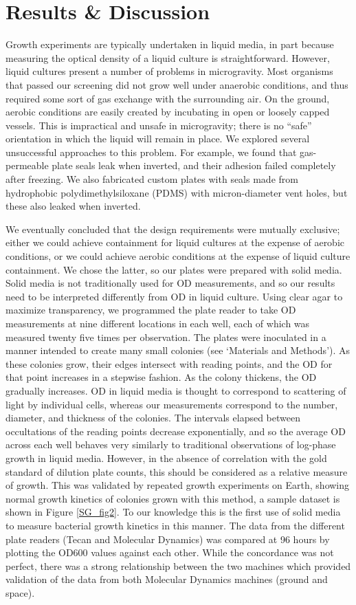 \section{Results \& Discussion}

Growth experiments are typically undertaken in liquid media, in part because measuring the optical density of a liquid culture is straightforward. However, liquid cultures present a number of problems in microgravity. Most organisms that passed our screening did not grow well under anaerobic conditions, and thus required some sort of gas exchange with the surrounding air. On the ground, aerobic conditions are easily created by incubating in open or loosely capped vessels. This is impractical and unsafe in microgravity; there is no ``safe'' orientation in which the liquid will remain in place. We explored several unsuccessful approaches to this problem. For example, we found that gas-permeable plate seals leak when inverted, and their adhesion failed completely after freezing. We also fabricated custom plates with seals made from hydrophobic polydimethylsiloxane (PDMS) with micron-diameter vent holes, but these also leaked when inverted.

We eventually concluded that the design requirements were mutually exclusive; either we could achieve containment for liquid cultures at the expense of aerobic conditions, or we could achieve aerobic conditions at the expense of liquid culture containment. We chose the latter, so our plates were prepared with solid media. Solid media is not traditionally used for OD measurements, and so our results need to be interpreted differently from OD in liquid culture. Using clear agar to maximize transparency, we programmed the plate reader to take OD measurements at nine different locations in each well, each of which was measured twenty five times per observation. The plates were inoculated in a manner intended to create many small colonies (see `Materials and Methods'). As these colonies grow, their edges intersect with reading points, and the OD for that point increases in a stepwise fashion. As the colony thickens, the OD gradually increases. OD in liquid media is thought to correspond to scattering of light by individual cells, whereas our measurements correspond to the number, diameter, and thickness of the colonies. The intervals elapsed between occultations of the reading points decrease exponentially, and so the average OD across each well behaves very similarly to traditional observations of log-phase growth in liquid media. However, in the absence of correlation with the gold standard of dilution plate counts, this should be considered as a relative measure of growth. This was validated by repeated growth experiments on Earth, showing normal growth kinetics of colonies grown with this method, a sample dataset is shown in Figure \ref{SG_fig2}. To our knowledge this is the first use of solid media to measure bacterial growth kinetics in this manner. The data from the different plate readers (Tecan and Molecular Dynamics) was compared at 96 hours by plotting the OD600 values against each other. While the concordance was not perfect, there was a strong relationship between the two machines which provided validation of the data from both Molecular Dynamics machines (ground and space).

